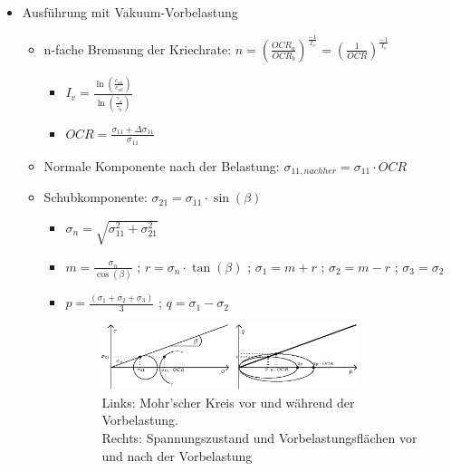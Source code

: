 \documentclass[fleqn,twoside]{article}
\begin{document}
\begin{itemize}
	\item Ausführung mit Vakuum-Vorbelastung 
		\begin{itemize}
			\item n-fache Bremsung der Kriechrate: $n = (\frac{OCR_a}{OCR_b})^{\frac{-1}{I_v}}= (\frac{1}{OCR})^{\frac{-1}{I_v}}$
			\begin{itemize}
				\item $I_v=\frac{\ln\left(\frac{c_{ua}}{c_{ub}}\right)}{\ln\left(\frac{\dot{\gamma_a}}{\dot{\gamma_b}}\right)}$ %
				\item $OCR = \frac{\sigma_{11}+\Delta \sigma_{11}}{\sigma_{11}}$
			\end{itemize}
			\item Normale Komponente nach der Belastung: $\sigma_{11,nachher}=\sigma_{11} \cdot OCR$
			\item Schubkomponente: $\sigma_{21} = \sigma_{11} \cdot \sin(\beta)$
			\begin{itemize}
				\item $\sigma_n = \sqrt{\sigma_{11}^2 + \sigma_{21}^2}$
				\item $m=\frac{\sigma_n}{\cos(\beta)}$ ; $r=\sigma_n \cdot \tan(\beta)$ ; $\sigma_1=m+r$ ; $\sigma_2=m-r$ ; $\sigma_3 = \sigma_2$
				\item $p=\frac{(\sigma_1+\sigma_2+\sigma_3)}{3}$ ; $q=\sigma_1-\sigma_2$
    \begin{figure}[H]		
		\includegraphics[width=0.8\textwidth]{Grafiken/Konsolidierung_Kriechhang.eps}
		\caption{Links: Mohr'scher Kreis vor und während der Vorbelastung.\\ 
		Rechts: Spannungszustand und Vorbelastungsflächen vor und nach der Vorbelastung}
    \end{figure}
		\end{itemize}
	\end{itemize}
	

\end{itemize}
\end{document}
